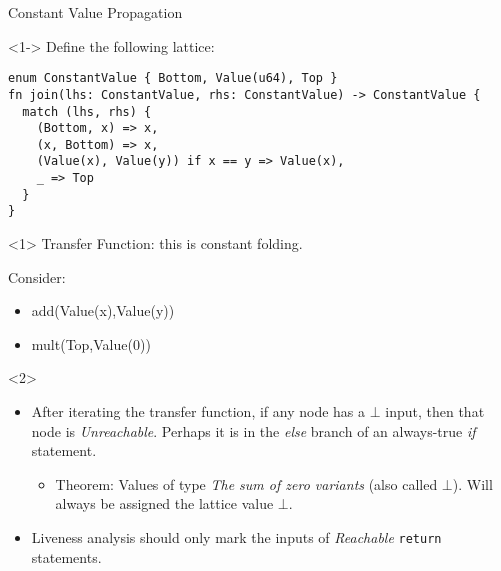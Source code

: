 \documentclass[presentation]{beamer}
\begin{document}
\begin{frame}[label={sec:org496c398},fragile]{Constant Value Propagation}
 \begin{onlyenv}<1->
Define the following lattice:

\begin{verbatim}
enum ConstantValue { Bottom, Value(u64), Top }
fn join(lhs: ConstantValue, rhs: ConstantValue) -> ConstantValue {
  match (lhs, rhs) {
    (Bottom, x) => x,
    (x, Bottom) => x,
    (Value(x), Value(y)) if x == y => Value(x),
    _ => Top
  }
}
\end{verbatim}
\end{onlyenv}
\begin{onlyenv}<1>
Transfer Function: this is constant folding.

Consider:
\begin{itemize}
\item add(Value(x),Value(y))
\item mult(Top,Value(0))
\end{itemize}
\end{onlyenv}
\begin{onlyenv}<2>
\begin{itemize}
\item After iterating the transfer function, if any node has a \(\bot\) input, then that node is \emph{Unreachable}. Perhaps it is in the \emph{else} branch of an always-true \emph{if} statement.

\begin{itemize}
\item Theorem: Values of type \emph{The sum of zero variants} (also called \(\bot\)). Will always be assigned the lattice value \(\bot\).
\end{itemize}

\item Liveness analysis should only mark the inputs of \emph{Reachable} \texttt{return} statements.
\end{itemize}
\end{onlyenv}
\end{frame}
\end{document}
